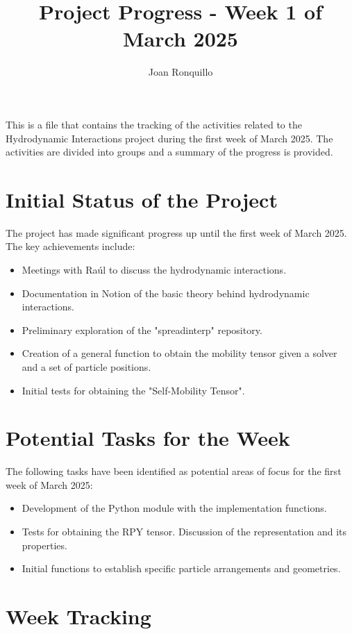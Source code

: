 \documentclass[12pt]{article} %
\begin{document}
\author{Joan Ronquillo}

\title{Project Progress - Week 1 of March 2025}
\maketitle

This is a file that contains the tracking of the activities related to the Hydrodynamic
Interactions project during the first week of March 2025. The activities are divided into
groups and a summary of the progress is provided.

\section{Initial Status of the Project}
The project has made significant progress up until the first week of March 2025. The key achievements include:

\begin{itemize}
    \item Meetings with Raúl to discuss the hydrodynamic interactions.
    \item Documentation in Notion of the basic theory behind hydrodynamic interactions.
    \item Preliminary exploration of the "spreadinterp" repository.
    \item Creation of a general function to obtain the mobility tensor given a solver and a set of particle positions.
    \item Initial tests for obtaining the "Self-Mobility Tensor".
\end{itemize}

\section{Potential Tasks for the Week}
The following tasks have been identified as potential areas of focus for the first week of March 2025:
\begin{itemize}
    \item Development of the Python module with the implementation functions.
    \item Tests for obtaining the RPY tensor. Discussion of the representation and its properties.
    \item Initial functions to establish specific particle arrangements and geometries.
\end{itemize}

\section{Week Tracking}
\end{document}
